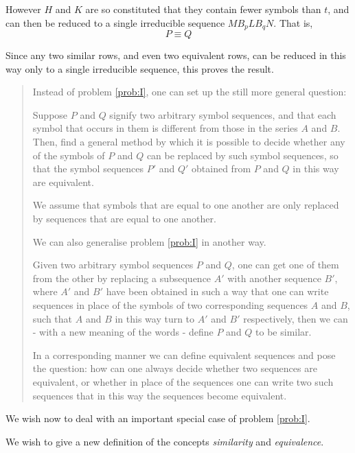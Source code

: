 However $H$ and $K$ are so constituted that they contain fewer symbols than
$t$, and can then be reduced to a single irreducible sequence $M B_p L
B_q N$.  That is, 
$$P \equiv Q$$

Since any two similar rows, and even two equivalent rows, can be
reduced in this way only to a single irreducible sequence, this proves
the result.

\bigskip

\begin{quotation}
Instead of problem \ref{prob:I}, one can set up the still more general
question:

Suppose $P$ and $Q$ signify two arbitrary symbol sequences, and that
each symbol that occurs in them is different from those in the series
$A$ and $B$.  Then, find a general method by which it is possible to
decide whether any of the symbols of $P$ and $Q$ can be replaced by
such symbol sequences, so that the symbol sequences $P'$ and $Q'$
obtained from $P$ and $Q$ in this way are equivalent.

We assume that symbols that are equal to one another are only replaced
by sequences that are equal to one another.

\medskip

We can also generalise problem \ref{prob:I} in another way.

Given two arbitrary symbol sequences $P$ and $Q$, one can 
get one of them from the other by replacing a subsequence $A'$ with
another sequence $B'$, where $A'$ and $B'$ have been obtained in such
a way that one can write sequences in place of the symbols of two
corresponding sequences $A$ and $B$, such that $A$ and $B$ in this way
turn to $A'$ and $B'$ respectively, then we can - with a new meaning
of the words - define $P$ and $Q$ to be similar.


In a corresponding manner we can define equivalent sequences and pose
the question: how can one always decide whether two sequences are
equivalent, or whether in place of the sequences one can write two
such sequences that in this way the sequences become equivalent.

\end{quotation}

We wish now to deal with an important special case of problem \ref{prob:I}.

We wish to give a new definition of the concepts \emph{similarity} and
\emph{equivalence}.

